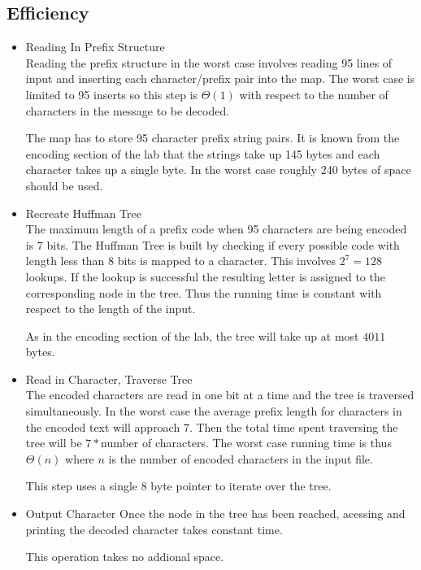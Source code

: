 \documentclass{article}
\begin{document}
\subsection{Efficiency}
\begin{itemize}
    \item Reading In Prefix Structure\\
        Reading the prefix structure in the worst case involves reading 95 lines of input and inserting each character/prefix pair into the map. The worst case is limited to 95 inserts so this step is $\Theta(1)$ with respect to the number of characters in the message to be decoded. 

        The map has to store 95 character prefix string pairs. It is known from the encoding section of the lab that the strings take up 145 bytes and each character takes up a single byte. In the worst case roughly 240 bytes of space should be used.

    \item Recreate Huffman Tree\\
        The maximum length of a prefix code when 95 characters are being encoded is 7 bits. The Huffman Tree is built by checking if every possible code with length less than 8 bits is mapped to a character. This involves $2^7 = 128$ lookups. If the lookup is successful the resulting letter is assigned to the corresponding node in the tree. Thus the running time is constant with respect to the length of the input. 

        As in the encoding section of the lab, the tree will take up at most $4011$ bytes.

    \item Read in Character, Traverse Tree\\
        The encoded characters are read in one bit at a time and the tree is traversed simultaneously. In the worst case the average prefix length for characters in the encoded text will approach 7. Then the total time spent traversing the tree will be $7 * $number of characters. The worst case running time is thus $\Theta(n)$ where $n$ is the number of encoded characters in the input file.

        This step uses a single 8 byte pointer to iterate over the tree.

    \item Output Character
        Once the node in the tree has been reached, acessing and printing the decoded character takes constant time.

        This operation takes no addional space.
\end{itemize}
\end{document}
